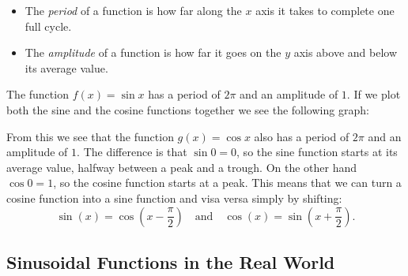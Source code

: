 \begin{itemize}
\item The \emph{period} of a function is how far along the $x$ axis it takes to complete one full cycle.
\item The \emph{amplitude} of a function is how far it goes on the $y$ axis above and below its average value.
\end{itemize}
The function $f(x) = \sin x$ has a period of $2 \pi$ and an amplitude of $1$.  If we plot
both the sine and the cosine functions together we see the following graph:
\begin{center}
\end{center}
From this we see that the function $g(x) = \cos x$ also has a period of $2 \pi$ and an
amplitude of $1$.  The difference is that $\sin 0 = 0$, so the sine function starts at its
average value, halfway between a peak and a trough.  On the other hand $\cos 0 = 1$, so
the cosine function starts at a peak.  This means that we can turn a cosine function into
a sine function and visa versa simply by shifting:
\[ \sin(x) = \cos \left( x - \frac{\pi}{2} \right) \quad \text{and} \quad \cos(x) = \sin
\left( x + \frac{\pi}{2} \right). \]


\subsection*{Sinusoidal Functions in the Real World}

